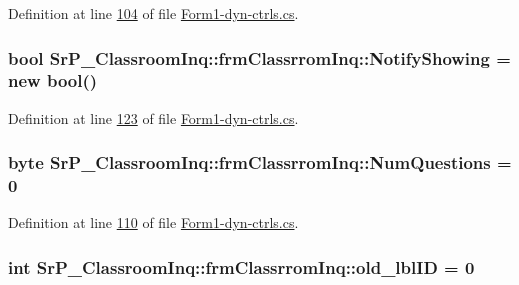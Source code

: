 \-Definition at line \hyperlink{_form1-dyn-ctrls_8cs_source_l00104}{104} of file \hyperlink{_form1-dyn-ctrls_8cs_source}{\-Form1-\/dyn-\/ctrls.\-cs}.

\hypertarget{class_sr_p___classroom_inq_1_1frm_classrrom_inq_a13f540b89ba154a7b133ae266eeb18aa}{
\subsubsection[{\-Notify\-Showing}]{\setlength{\rightskip}{0pt plus 5cm}bool {\bf \-Sr\-P\-\_\-\-Classroom\-Inq\-::frm\-Classrrom\-Inq\-::\-Notify\-Showing} = new bool()}}
\label{class_sr_p___classroom_inq_1_1frm_classrrom_inq_a13f540b89ba154a7b133ae266eeb18aa}


\-Definition at line \hyperlink{_form1-dyn-ctrls_8cs_source_l00123}{123} of file \hyperlink{_form1-dyn-ctrls_8cs_source}{\-Form1-\/dyn-\/ctrls.\-cs}.

\hypertarget{class_sr_p___classroom_inq_1_1frm_classrrom_inq_a7e4d497088afdd32623b3b54749210a0}{
\subsubsection[{\-Num\-Questions}]{\setlength{\rightskip}{0pt plus 5cm}byte {\bf \-Sr\-P\-\_\-\-Classroom\-Inq\-::frm\-Classrrom\-Inq\-::\-Num\-Questions} = 0}}
\label{class_sr_p___classroom_inq_1_1frm_classrrom_inq_a7e4d497088afdd32623b3b54749210a0}


\-Definition at line \hyperlink{_form1-dyn-ctrls_8cs_source_l00110}{110} of file \hyperlink{_form1-dyn-ctrls_8cs_source}{\-Form1-\/dyn-\/ctrls.\-cs}.

\hypertarget{class_sr_p___classroom_inq_1_1frm_classrrom_inq_ac56e0f039ce0113331d9bdd322b30827}{
\subsubsection[{old\-\_\-lbl\-I\-D}]{\setlength{\rightskip}{0pt plus 5cm}int {\bf \-Sr\-P\-\_\-\-Classroom\-Inq\-::frm\-Classrrom\-Inq\-::old\-\_\-lbl\-I\-D} = 0}}
\label{class_sr_p___classroom_inq_1_1frm_classrrom_inq_ac56e0f039ce0113331d9bdd322b30827}


